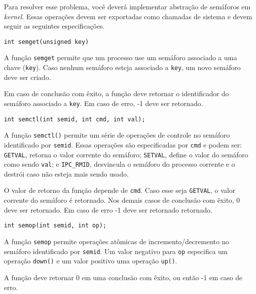 \documentclass[11pt]{article}
\begin{document}
Para resolver esse problema, você deverá implementar abstração de semáforos em \textit{kernel}. Essas operações devem ser exportadas como chamadas de sistema e devem seguir as seguintes especificações.

\texttt{int semget(unsigned key)}

	\begin{addmargin}[2em]{0em}

	A função \texttt{semget} permite que um processo use um semáforo associado a uma chave (\texttt{key}).
	Caso nenhum semáforo esteja associado a \texttt{key}, um novo semáforo deve ser criado.

	Em caso de conclusão com êxito, a função deve retornar o identificador do semáforo associado a \texttt{key}.
	Em caso de erro, -1 deve ser retornado.
	
	\end{addmargin}

\texttt{int semctl(int semid, int cmd, int val);}

	\begin{addmargin}[2em]{0em}

	A função \texttt{semctl()} permite um série de operações de controle no semáforo identificado por \texttt{semid}.
	Essas operações são especificadas por \texttt{cmd} e podem ser:
	\texttt{GETVAL}, retorna o valor corrente do semáforo;
	\texttt{SETVAL}, define o valor do semáforo como sendo \texttt{val}; e
	\texttt{IPC\_RMID}, desvincula o semáforo do processo corrente e o destrói caso não esteja mais sendo usado.

	O valor de retorno da função depende de \texttt{cmd}. 
	Caso esse seja \texttt{GETVAL}, o valor corrente do semáforo é retornado.
	Nos demais casos de conclusão com êxito, 0 deve ser retornado.
	Em caso de erro -1 deve ser retornado retornado.

	\end{addmargin}
	
\texttt{int semop(int semid, int op);}

	\begin{addmargin}[2em]{0em}

	A função \texttt{semop} permite operações atômicas de incremento/decremento no semáforo identificado por \texttt{semid}.	
	Um valor negativo para \texttt{op} especifica um operação \texttt{down()} e um valor positivo uma operação \texttt{up()}.
	
	A função deve retornar 0 em uma conclusão com êxito, ou então -1 em caso de erro.
	
	\end{addmargin}
	
\end{document}

